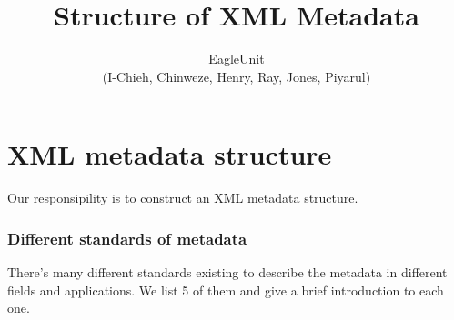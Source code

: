\documentclass[a4paper]{article} %
\begin{document}
	
	\title{Structure of XML Metadata}
	\author{EagleUnit \\ (I-Chieh, Chinweze, Henry, Ray, Jones, Piyarul)} 
	
	\maketitle                     %
	
	
	
	
	
	\section*{XML metadata structure}
	\label{sec:abs}
	
	
	Our responsipility is to construct an XML metadata structure.
	
	
	
	\subsubsection{Different standards of metadata}
	\label{sec:mets}
	There's many different standards existing to describe the metadata in different fields and applications. We list 5 of them and give a brief introduction to each one.
	
\end{document}
